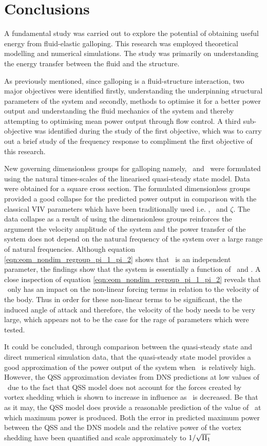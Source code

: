 \chapter{Conclusions}

A fundamental study was carried out to explore the potential of obtaining useful energy from fluid-elastic galloping. This research was employed theoretical modelling and numerical simulations. The study was primarily on understanding the energy transfer between the fluid and the structure.  

As previously mentioned, since  galloping is a fluid-structure interaction, two major objectives were identified firstly, understanding the underpinning structural parameters of the system and secondly, methods to optimise it for a better power output and understanding the fluid mechanics of the system and thereby attempting to optimising mean power output through flow control. A third sub-objective was identified during the study of the first objective, which was to carry out a brief study of the frequency response to compliment the first objective of this research.  

New governing dimensionless groups for galloping namely, \massstiff\ and \massdamp\ were formulated using the natural times-scales of the linearised quasi-steady state model. Data were obtained for a square cross section. The formulated dimensionless groups provided a good collapse for the predicted power output in comparison with the classical VIV parameters which have been traditionally used i.e. \ustar, \mstar\ and $\zeta$. The data collapse as a result of using the dimensionless groups reinforces the argument the velocity amplitude of the system and the power transfer of the system does not depend on the natural frequency of the system over a large range of natural frequencies. Although equation \ref{eqn:eom_nondim_regroup_pi_1_pi_2} shows that \mstar\ is an independent parameter, the findings show that the system is essentially a function of \massstiff\ and \massdamp. A close inspection of equation \ref{eqn:eom_nondim_regroup_pi_1_pi_2} reveals that \mstar\ only has an impact on the non-linear forcing terms in relation to the velocity of the body. Thus in order for these non-linear terms to be significant, the the induced angle of attack and therefore, the velocity of the body needs to be very large, which appears not to be the case for the rage of parameters which were tested. 

 It could be concluded, through comparison between the quasi-steady state and direct numerical simulation data, that the quasi-steady state model provides a good approximation of the power output of the system when \massstiff\ is relatively high. However, the QSS approximation deviates from  DNS predictions at low values of \massstiff\ due to the fact that QSS model does not account for the forces created by vortex shedding which is shown to increase in influence as \massstiff\ is decreased. Be that as it may, the QSS model does provide a reasonable prediction of the value of \massdamp\ at which maximum power is produced. Both the error in predicted maximum power between the QSS and the DNS models and the relative power of the vortex shedding have been quantified and scale approximately to $1/\sqrt{\Pi_1}$  
 
